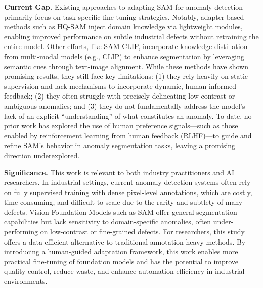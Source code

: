 \documentclass[11pt]{article}
\begin{document}
\textbf{Current Gap.} Existing approaches to adapting SAM for anomaly detection primarily focus on task-specific fine-tuning strategies. Notably, adapter-based methods such as HQ-SAM inject domain knowledge via lightweight modules, enabling improved performance on subtle industrial defects without retraining the entire model. Other efforts, like SAM-CLIP, incorporate knowledge distillation from multi-modal models (e.g., CLIP) to enhance segmentation by leveraging semantic cues through text-image alignment. While these methods have shown promising results, they still face key limitations: (1) they rely heavily on static supervision and lack mechanisms to incorporate dynamic, human-informed feedback; (2) they often struggle with precisely delineating low-contrast or ambiguous anomalies; and (3) they do not fundamentally address the model’s lack of an explicit “understanding” of what constitutes an anomaly. To date, no prior work has explored the use of human preference signals—such as those enabled by reinforcement learning from human feedback (RLHF)—to guide and refine SAM’s behavior in anomaly segmentation tasks, leaving a promising direction underexplored.


\textbf{Significance.} This work is relevant to both industry practitioners and AI researchers. In industrial settings, current anomaly detection systems often rely on fully supervised training with dense pixel-level annotations, which are costly, time-consuming, and difficult to scale due to the rarity and subtlety of many defects. Vision Foundation Models such as SAM offer general segmentation capabilities but lack sensitivity to domain-specific anomalies, often under-performing on low-contrast or fine-grained defects. For researchers, this study offers a data-efficient alternative to traditional annotation-heavy methods. By introducing a human-guided adaptation framework, this work enables more practical fine-tuning of foundation models and has the potential to improve quality control, reduce waste, and enhance automation efficiency in industrial environments.  
\end{document}
